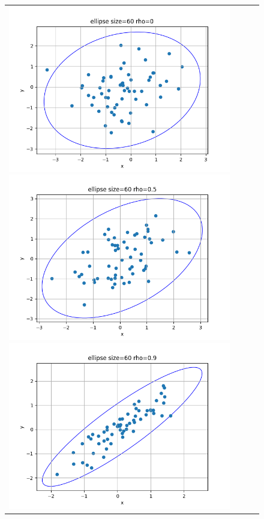 \begin{figure}[H]
	\begin{tabular}{cccc}
		\includegraphics[scale=0.3]{ellipse_60_0.png}
		\includegraphics[scale=0.3]{ellipse_60_0.5.png}
		\includegraphics[scale=0.3]{ellipse_60_0.9.png}

\end{tabular}
\end{figure}

